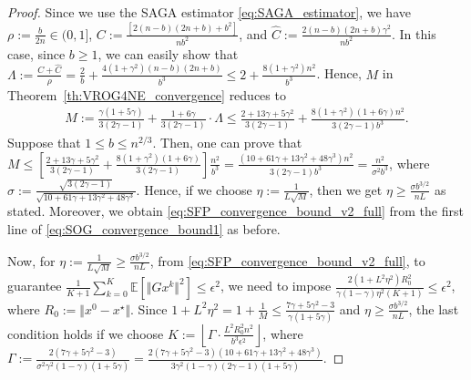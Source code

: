 \documentclass{article}
\newcommand{\norms}[1]{\Vert#1\Vert}
\newcommand{\Exp}[1]{\mathbb{E}\left[#1\right]}
\theoremstyle{plain}
\theoremstyle{definition}
\theoremstyle{remark}
\begin{document}
\begin{proof}
Since we use the SAGA estimator \eqref{eq:SAGA_estimator}, we have  $\rho := \frac{b}{2n} \in (0, 1]$, $C :=  \frac{[ 2(n - b)(2n+b) + b^2] }{ n b^2}$, and $\hat{C} := \frac{2(n - b)(2n+b) \gamma^2}{ nb^2}$.
In this case, since $b \geq 1$, we can easily show that $\Lambda := \frac{C + \hat{C}}{\rho} = \frac{2}{b} + \frac{4(1+\gamma^2)(n-b)(2n+b)}{b^3} \leq 2 + \frac{8(1+\gamma^2)n^2}{b^3}$.
Hence, $M$ in Theorem~\ref{th:VROG4NE_convergence} reduces to 
\begin{equation*}
\begin{array}{lcl}
M := \frac{\gamma(1+5\gamma)}{3(2\gamma-1)} + \frac{1 + 6\gamma}{3(2\gamma -1) } \cdot \Lambda \leq  \frac{2 + 13\gamma + 5\gamma^2}{3(2\gamma-1)} +  \frac{8(1+\gamma^2)(1 + 6\gamma)n^2}{3(2\gamma -1) b^3}.
\end{array}
\end{equation*}
Suppose that $1 \leq b \leq n^{2/3}$.
Then, one can prove that $M \leq \left[ \frac{2 + 13\gamma + 5\gamma^2 }{3(2\gamma-1)} +  \frac{8(1+\gamma^2)(1 + 6\gamma)}{3(2\gamma -1)} \right] \frac{n^2}{b^3} = \frac{(10 + 61\gamma + 13\gamma^2 + 48\gamma^3)n^2}{3(2\gamma-1)b^3} = \frac{n^2}{ \sigma^2b^3}$, where $\sigma :=  \frac{\sqrt{3(2\gamma-1)}}{\sqrt{10 + 61\gamma + 13\gamma^2 + 48\gamma^3}}$.
Hence, if we choose $\eta := \frac{1}{L\sqrt{M}}$, then we get $\eta \geq \frac{\sigma b^{3/2}}{nL}$ as stated.
Moreover, we obtain \eqref{eq:SFP_convergence_bound_v2_full} from the first line of \eqref{eq:SOG_convergence_bound1} as before.

Now, for $\eta := \frac{1}{L\sqrt{M}} \geq \frac{\sigma b^{3/2}}{nL}$, from \eqref{eq:SFP_convergence_bound_v2_full}, to guarantee $\frac{1}{K+1}\sum_{k=0}^K\Exp{\norms{Gx^k}^2} \leq \epsilon^2$, we need to impose $\frac{2(1 + L^2\eta^2)R_0^2}{\gamma(1-\gamma) \eta^2(K+1)} \leq \epsilon^2$, where $R_0 := \norms{x^0 - x^{\star}}$.
Since $1+ L^2\eta^2 = 1 + \frac{1}{M} \leq \frac{7\gamma + 5\gamma^2-3}{\gamma(1+5\gamma)}$ and $\eta \geq  \frac{\sigma b^{3/2}}{n L}$, the last condition holds if we choose $K :=  \left\lfloor \Gamma \cdot \frac{L^2 R_0^2 n^2}{ b^3 \epsilon^2} \right\rfloor$, where $\Gamma := \frac{2(7\gamma + 5\gamma^2-3)}{\sigma^2\gamma^2(1-\gamma)(1+5\gamma)} = \frac{2(7\gamma + 5\gamma^2-3)(10 + 61\gamma + 13\gamma^2 + 48\gamma^3)}{3\gamma^2(1-\gamma)(2\gamma-1)(1+5\gamma)}$.


\end{proof}
\end{document}
